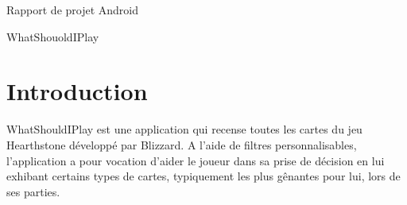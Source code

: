 \documentclass[a4paper,oneside,10pt]{extarticle}
\begin{document}
\begin{center}\Large
Rapport de projet Android

WhatShouoldIPlay
\end{center}
\vspace*{0.25cm}

\section{Introduction}

WhatShouldIPlay est une application qui recense toutes les cartes du jeu Hearthstone développé par Blizzard. A l'aide de filtres personnalisables, l'application a pour vocation d'aider le joueur dans sa prise de décision en lui exhibant certains types de cartes, typiquement les plus gênantes pour lui, lors de ses parties.
\end{document}
